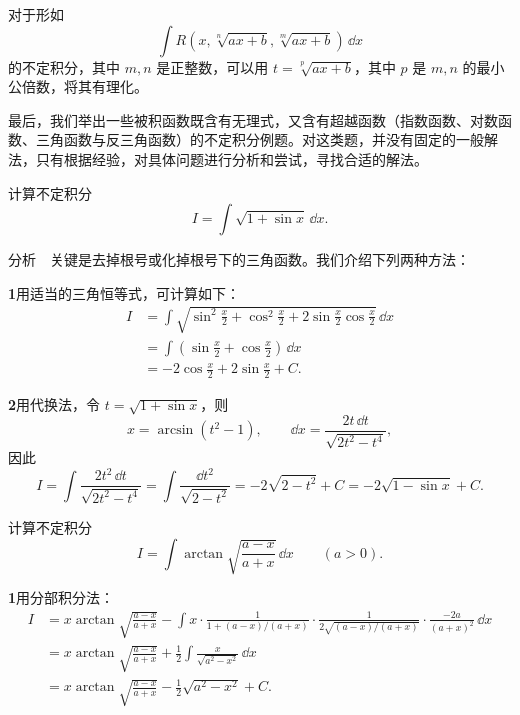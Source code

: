 \begin{xremark}
对于形如
\[
  \int R\left(x,\sqrt[n]{ax+b},\sqrt[m]{ax+b}\right)\,\dd x
\]
的不定积分，其中 $m,n$ 是正整数，可以用 $t=\sqrt[p]{ax+b}$，其中 $p$ 是 $m,n$ 的最小公倍数，将其有理化。
\end{xremark}

最后，我们举出一些被积函数既含有无理式，又含有超越函数（指数函数、对数函数、三角函数与反三角函数）的不定积分例题。对这类题，并没有固定的一般解法，只有根据经验，对具体问题进行分析和尝试，寻找合适的解法。

\begin{xexample}[9.2.9]
计算不定积分
\[
  I=\int\sqrt{1+\sin x}\,\dd x.
\]
\end{xexample}

分析　关键是去掉根号或化掉根号下的三角函数。我们介绍下列两种方法：

\begin{xsolution}
\textbf{1}\quad 用适当的三角恒等式，可计算如下：
\begin{align*}
  I
  &=\int\sqrt{\sin^2\frac x2+\cos^2\frac x2+2\sin\frac x2\cos\frac x2}\,\dd x\\
  &=\int\left(\sin\frac x2+\cos\frac x2\right)\,\dd x\\
  &=-2\cos\frac x2+2\sin\frac x2+C.
\end{align*}
\end{xsolution}

\begin{xsolution}
\textbf{2}\quad 用代换法，令 $t=\sqrt{1+\sin x}$，则
\[
  x=\arcsin(t^2-1),
  \qquad
  \dd x=\frac{2t\,\dd t}{\sqrt{2t^2-t^4}},
\]
因此
\[
  I=\int\frac{2t^2\,\dd t}{\sqrt{2t^2-t^4}}
   =\int\frac{\dd t^2}{\sqrt{2-t^2}}
   =-2\sqrt{2-t^2}+C
   =-2\sqrt{1-\sin x}+C.
\]
\end{xsolution}

\begin{xexample}[9.2.10]
计算不定积分
\[
  I=\int\arctan\sqrt{\frac{a-x}{a+x}}\,\dd x
  \qquad(a>0).
\]
\end{xexample}

\begin{xsolution}
\textbf{1}\quad 用分部积分法：
\begin{align*}
  I
  &=x\arctan\sqrt{\frac{a-x}{a+x}}
    -\int x\cdot\frac1{1+(a-x)/(a+x)}\cdot\frac1{2\sqrt{(a-x)/(a+x)}}\cdot\frac{-2a}{(a+x)^2}\,\dd x\\
  &=x\arctan\sqrt{\frac{a-x}{a+x}}
    +\frac12\int\frac{x}{\sqrt{a^2-x^2}}\,\dd x\\
  &=x\arctan\sqrt{\frac{a-x}{a+x}}-\frac12\sqrt{a^2-x^2}+C.
\end{align*}
\end{xsolution}

